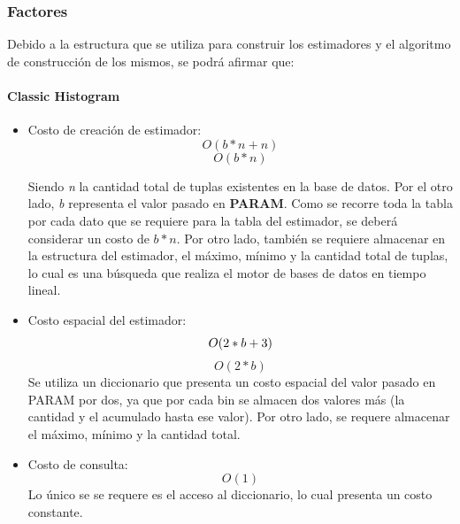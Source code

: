 \documentclass[10pt, a4paper,english,spanish,hidelinks]{article}
\begin{document}
\subsubsection{Factores}

Debido a la estructura que se utiliza para construir los estimadores y el algoritmo de
construcción de los mismos, se podrá afirmar que:

\paragraph{Classic Histogram}
\begin{itemize}

\item Costo de creación de estimador:
\begin{equation}
O(b * n + n )
\end{equation}
\begin{equation}
O(b * n)
\end{equation}

Siendo \textit{n} la cantidad total de tuplas existentes en la base de datos.
Por el otro lado, \textit{b} representa el valor pasado en \textbf{PARAM}.
Como se recorre toda la tabla por cada dato que se requiere para la tabla del estimador,
se deberá considerar un costo de $b * n$. Por otro lado, también se requiere almacenar en
la estructura del estimador, el máximo, mínimo y la cantidad total de tuplas, lo cual es
una búsqueda que realiza el motor de bases de datos en tiempo lineal.

\item Costo espacial del estimador:
\begin{equation}
O(2 * b + 3 ) \\
\end{equation}
\begin{equation}
O(2 * b)
\end{equation}
Se utiliza un diccionario que presenta un costo espacial del valor pasado en PARAM por dos,
ya que por cada bin se almacen dos valores más (la cantidad y el acumulado hasta ese valor).
Por otro lado, se requere almacenar el máximo, mínimo y la cantidad total.

\item Costo de consulta:
\begin{equation}
O(1)
\end{equation}
Lo único se se requere es el acceso al diccionario, lo cual presenta un costo constante.

\end{itemize}
\end{document}
